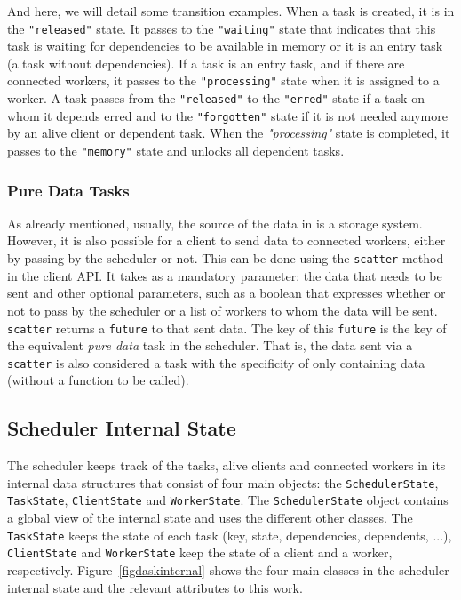 And here, we will detail some transition examples. 
When a task is created, it is in the \texttt{"released"} state. It passes to the \texttt{"waiting"} state that indicates that this task is waiting for dependencies to be available in memory or it is an entry task (a task without dependencies).
If a task is an entry task, and if there are connected workers, it passes to the \texttt{"processing"} state when it is assigned to a worker.  
A task passes from the \texttt{"released"} to the \texttt{"erred"} state if a task on whom it depends erred and to the \texttt{"forgotten"} state if it is not needed anymore by an alive client or dependent task. 
When the \textit{"processing"} state is completed, it passes to the \texttt{"memory"} state and unlocks all dependent tasks. 



\subsubsection{Pure Data Tasks}\label{sec:puredata}
As already mentioned, usually, the source of the data in \dask is a storage system. However, it is also possible for a client to send data to connected workers, either by passing by the scheduler or not. 
This can be done using the \texttt{scatter} method in the client API. It takes as a mandatory parameter: the data that needs to be sent and other optional parameters, such as a boolean that expresses whether or not to pass by the scheduler or a list of workers to whom the data will be sent. 
\texttt{scatter} returns a \texttt{future} to that sent data. The key of this \texttt{future} is the key of the equivalent \textit{pure data} task in the \dask scheduler. That is, the data sent via a \texttt{scatter} is also considered a task with the specificity of only containing data (without a function to be called). 


\subsection{Scheduler Internal State}\label{sec:scheduler}

The scheduler keeps track of the tasks, alive clients and connected workers in its internal data structures that consist of four main objects: the \texttt{SchedulerState}, \texttt{TaskState}, \texttt{ClientState} and \texttt{WorkerState}.
The \texttt{SchedulerState} object contains a global view of the internal state and uses the different other classes. The \texttt{TaskState} keeps the state of each task (key, state, dependencies, dependents, ...), \texttt{ClientState} and \texttt{WorkerState} keep the state of a client and a worker, respectively.
Figure~\ref{figdaskinternal} shows the four main classes in the \dask scheduler internal state and the relevant attributes to this work. 

